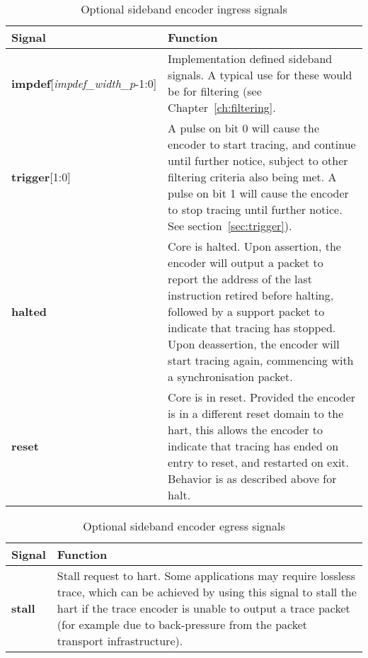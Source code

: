 \begin{table}[htp]
    \centering
    \caption{Optional sideband encoder ingress signals}
    \label{tab:ingress-side-band}
    \begin{tabulary}{\textwidth}{|l|p{100mm}|}
        \hline
        \textbf{Signal} & \textbf{Function} \\
        \hline
        \textbf{impdef}[\textit{impdef\_width\_p}-1:0] &  Implementation defined sideband signals.  A typical use for
        these would be for filtering (see Chapter~\ref{ch:filtering}.\\
        \hline
        \textbf{trigger}[1:0] & A pulse on bit 0 will cause the encoder to start tracing, and continue until further 
        notice, subject to other filtering criteria also being met.\newline
        A pulse on bit 1 will cause the encoder to stop tracing until further notice.  See section~\ref{sec:trigger}).\\
        \hline
        \textbf{halted}& Core is halted.  Upon assertion, the encoder will output a packet to report the address 
        of the last instruction retired before halting, followed by a support packet to indicate that tracing has stopped. 
        Upon deassertion, the encoder will start tracing again, commencing with a synchronisation packet.\\
        \hline
        \textbf{reset}& Core is in reset.  Provided the encoder is in a different reset domain to the hart, this
        allows the encoder to indicate that tracing has ended on entry to reset, and restarted on exit.  
        Behavior is as described above for halt.\\
        \hline
    \end{tabulary}
\end{table}

\begin{table}[htp]
    \centering
    \caption{Optional sideband encoder egress signals}
    \label{tab:egress-side-band}
    \begin{tabulary}{\textwidth}{|l|p{130mm}|}
        \hline
        \textbf{Signal} & \textbf{Function} \\
        \hline
        \textbf{stall}& Stall request to hart.  Some applications may require lossless trace, which can be achieved by
        using this signal to stall the hart if the trace encoder is unable to output a trace packet (for example due to 
        back-pressure from the packet transport infrastructure).\\
        \hline
    \end{tabulary}
\end{table}

